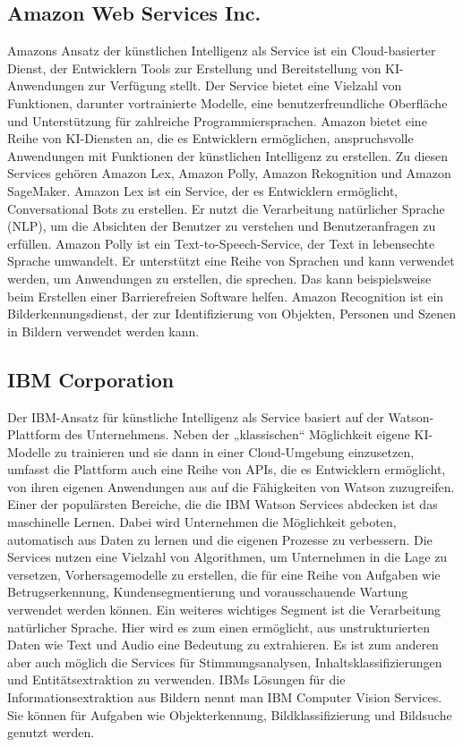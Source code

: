\newpage
\subsection{Amazon Web Services Inc.}
Amazons Ansatz der künstlichen Intelligenz als Service ist ein Cloud-basierter Dienst, der Entwicklern Tools zur Erstellung und Bereitstellung von KI-Anwendungen zur Verfügung stellt. Der Service bietet eine Vielzahl von Funktionen, darunter vortrainierte Modelle, eine benutzerfreundliche Oberfläche und Unterstützung für zahlreiche Programmiersprachen. Amazon bietet eine Reihe von KI-Diensten an, die es Entwicklern ermöglichen, anspruchsvolle Anwendungen mit Funktionen der künstlichen Intelligenz zu erstellen. Zu diesen Services gehören Amazon Lex, Amazon Polly, Amazon Rekognition und Amazon SageMaker. Amazon Lex ist ein Service, der es Entwicklern ermöglicht, Conversational Bots zu erstellen. Er nutzt die Verarbeitung natürlicher Sprache (NLP), um die Absichten der Benutzer zu verstehen und Benutzeranfragen zu erfüllen. Amazon Polly ist ein Text-to-Speech-Service, der Text in lebensechte Sprache umwandelt. Er unterstützt eine Reihe von Sprachen und kann verwendet werden, um Anwendungen zu erstellen, die sprechen. Das kann beispielsweise beim Erstellen einer Barrierefreien Software helfen. Amazon Recognition ist ein Bilderkennungsdienst, der zur Identifizierung von Objekten, Personen und Szenen in Bildern verwendet werden kann. \cite[vgl.][]{AWS.OA.2022}


\subsection{IBM Corporation}
Der IBM-Ansatz für künstliche Intelligenz als Service basiert auf der Watson-Plattform des Unternehmens. Neben der „klassischen“ Möglichkeit eigene KI-Modelle zu trainieren und sie dann in einer Cloud-Umgebung einzusetzen, umfasst die Plattform auch eine Reihe von APIs, die es Entwicklern ermöglicht, von ihren eigenen Anwendungen aus auf die Fähigkeiten von Watson zuzugreifen.
Einer der populärsten Bereiche, die die IBM Watson Services abdecken ist das maschinelle Lernen. Dabei wird Unternehmen die Möglichkeit geboten, automatisch aus Daten zu lernen und die eigenen Prozesse zu verbessern. Die Services nutzen eine Vielzahl von Algorithmen, um Unternehmen in die Lage zu versetzen, Vorhersagemodelle zu erstellen, die für eine Reihe von Aufgaben wie Betrugserkennung, Kundensegmentierung und vorausschauende Wartung verwendet werden können.
Ein weiteres wichtiges Segment ist die Verarbeitung natürlicher Sprache. Hier wird es zum einen ermöglicht, aus unstrukturierten Daten wie Text und Audio eine Bedeutung zu extrahieren. Es ist zum anderen aber auch möglich die Services für Stimmungsanalysen, Inhaltsklassifizierungen und Entitätsextraktion zu verwenden.
IBMs Lösungen für die Informationsextraktion aus Bildern nennt man IBM Computer Vision Services. Sie können für Aufgaben wie Objekterkennung, Bildklassifizierung und Bildsuche genutzt werden. \cite[vgl.][]{IBM.OA.2021} \\